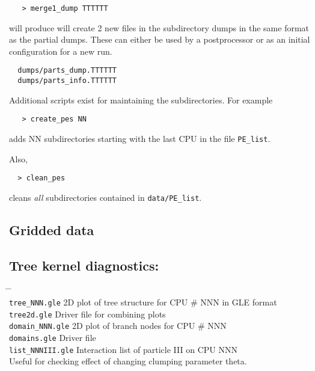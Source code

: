 \documentclass[11pt,psfig]{article}
\newcommand{\meno}{{\medskip\noindent}}
\begin{document}
\begin{verbatim}
   > merge1_dump TTTTTT
\end{verbatim}

\noindent
will produce will create 2 new files in the subdirectory dumps
in the same format as the partial dumps.  These can either be used by a
postprocessor or as an initial configuration for a new run.

\begin{verbatim}
  dumps/parts_dump.TTTTTT
  dumps/parts_info.TTTTTT
\end{verbatim}


\noindent
Additional scripts exist for maintaining the subdirectories.  For example

\begin{verbatim}
   > create_pes NN      
\end{verbatim}

\noindent 
adds NN subdirectories starting with the last CPU in the file \texttt{PE_list}.

\meno
Also,

\begin{verbatim}
  > clean_pes
\end{verbatim}

\noindent
cleans \textit{all} subdirectories contained in \texttt{data/PE_list}.


\subsection{Gridded data}

\subsection{Tree kernel diagnostics:}

\begin{tabbing}
\hspace{1cm} \= \hspace{3cm} \= \hspace{1cm} \=\\
\> \texttt{tree_NNN.gle} \>    2D plot of tree structure for CPU \# NNN in GLE
format \\
\> \texttt{tree2d.gle} \> Driver file for combining plots \\

\> \texttt{domain_NNN.gle} \>  2D plot of branch nodes for CPU \# NNN \\
\> \texttt{domains.gle} \> Driver file\\

\> \texttt{list_NNNIII.gle} \>   Interaction list of particle III on CPU NNN\\
\> \>                  Useful for checking effect of changing clumping
parameter theta.\\
\end{tabbing}
\end{document}
